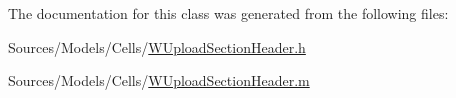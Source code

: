 The documentation for this class was generated from the following files\-:\begin{DoxyCompactItemize}
\item 
Sources/\-Models/\-Cells/\hyperlink{_w_upload_section_header_8h}{W\-Upload\-Section\-Header.\-h}\item 
Sources/\-Models/\-Cells/\hyperlink{_w_upload_section_header_8m}{W\-Upload\-Section\-Header.\-m}\end{DoxyCompactItemize}
